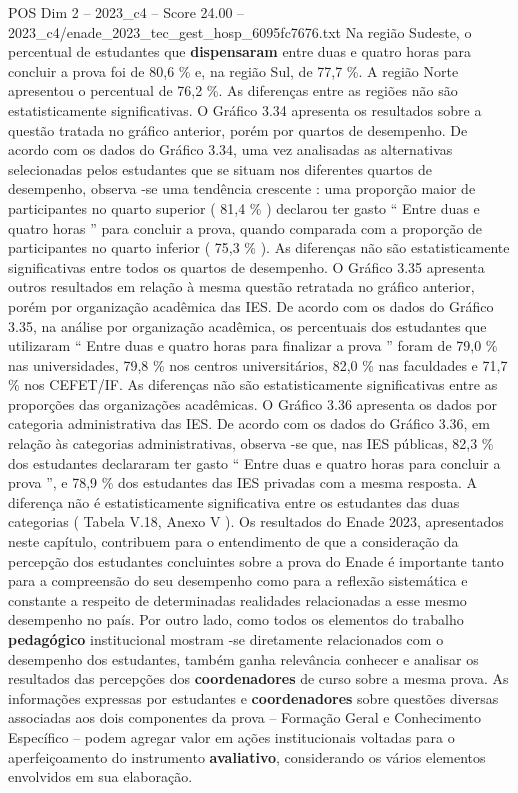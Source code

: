 \begin{textsample}{POS Dim 2 – 2023\_c4 – Score 24.00 – 2023\_c4/enade\_2023\_tec\_gest\_hosp\_6095fc7676.txt}
Na região Sudeste, o percentual de estudantes que \textbf{dispensaram} entre duas e quatro horas para concluir a prova foi de 80,6 \% e, na região Sul, de 77,7 \%.
A região Norte apresentou o percentual de 76,2 \%.
As diferenças entre as regiões não são estatisticamente significativas.
O Gráfico 3.34 apresenta os resultados sobre a questão tratada no gráfico anterior, porém por quartos de desempenho.
De acordo com os dados do Gráfico 3.34, uma vez analisadas as alternativas selecionadas pelos estudantes que se situam nos diferentes quartos de desempenho, observa -se uma tendência crescente : uma proporção maior de participantes no quarto superior ( 81,4 \% ) declarou ter gasto “ Entre duas e quatro horas ” para concluir a prova, quando comparada com a proporção de participantes no quarto inferior ( 75,3 \% ).
As diferenças não são estatisticamente significativas entre todos os quartos de desempenho.
O Gráfico 3.35 apresenta outros resultados em relação à mesma questão retratada no gráfico anterior, porém por organização acadêmica das IES.
De acordo com os dados do Gráfico 3.35, na análise por organização acadêmica, os percentuais dos estudantes que utilizaram “ Entre duas e quatro horas para finalizar a prova ” foram de 79,0 \% nas universidades, 79,8 \% nos centros universitários, 82,0 \% nas faculdades e 71,7 \% nos CEFET/IF.
As diferenças não são estatisticamente significativas entre as proporções das organizações acadêmicas.
O Gráfico 3.36 apresenta os dados por categoria administrativa das IES.
De acordo com os dados do Gráfico 3.36, em relação às categorias administrativas, observa -se que, nas IES públicas, 82,3 \% dos estudantes declararam ter gasto “ Entre duas e quatro horas para concluir a prova ”, e 78,9 \% dos estudantes das IES privadas com a mesma resposta.
A diferença não é estatisticamente significativa entre os estudantes das duas categorias ( Tabela V.18, Anexo V ).
Os resultados do Enade 2023, apresentados neste capítulo, contribuem para o entendimento de que a consideração da percepção dos estudantes concluintes sobre a prova do Enade é importante tanto para a compreensão do seu desempenho como para a reflexão sistemática e constante a respeito de determinadas realidades relacionadas a esse mesmo desempenho no país.
Por outro lado, como todos os elementos do trabalho \textbf{pedagógico} institucional mostram -se diretamente relacionados com o desempenho dos estudantes, também ganha relevância conhecer e analisar os resultados das percepções dos \textbf{coordenadores} de curso sobre a mesma prova.
As informações expressas por estudantes e \textbf{coordenadores} sobre questões diversas associadas aos dois componentes da prova – Formação Geral e Conhecimento Específico – podem agregar valor em ações institucionais voltadas para o aperfeiçoamento do instrumento \textbf{avaliativo}, considerando os vários elementos envolvidos em sua elaboração.

\end{textsample}
